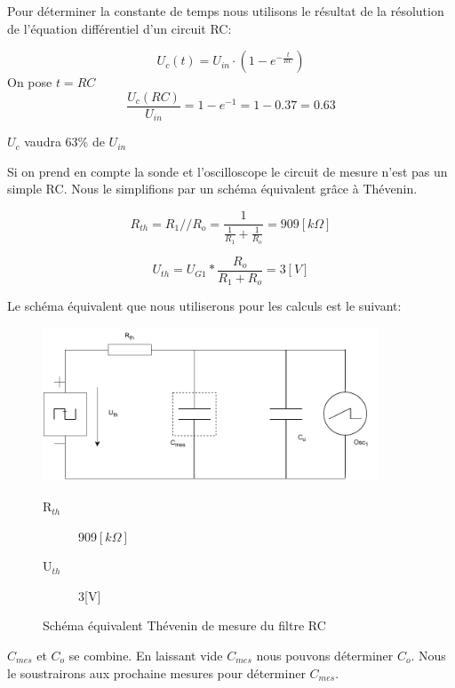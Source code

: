 \newpage

Pour déterminer la constante de temps nous utilisons le résultat de la résolution de l'équation différentiel d'un circuit RC: 

\begin{equation}
 U_{c}(t) = U_{in} \cdot (1 - e^{-\frac{t}{RC}})
\end{equation}
On pose $t = RC$
\begin{equation}
\frac{U_c(RC)}{U_{in}} = 1 - e^{-1} = 1 - 0.37 = 0.63
\end{equation}

 $U_c$ vaudra 63\% de $U_{in}$ 

 
Si on prend en compte la sonde et l'oscilloscope le circuit de mesure n'est pas un simple RC. Nous le simplifions par un schéma équivalent grâce à Thévenin. 
 
\begin{equation}
 R_{th} = R_1 // R_o = \frac{1}{\frac{1}{R_1} + \frac{1}{R_o}} = 909 [k\Omega]
\end{equation}

\begin{equation}
 U_{th} = U_{G1} * \frac{R_o}{R_1 + R_o} = 3 [V]
\end{equation}

Le schéma équivalent que nous utiliserons pour les calculs est le suivant:

\begin{figure}[!ht]
\centering
 \includegraphics[width=10cm]{schemaMesureTH.pdf}
 \begin{description}
 \item[R$_{th}$] 909$[k\Omega]$
 \item[U$_{th}$] 3[V]
\end{description}
 \caption{Schéma équivalent Thévenin de mesure du filtre RC}
\end{figure}

$C_{mes}$ et $C_o$ se combine. En laissant vide $C_{mes}$ nous pouvons déterminer $C_o$. Nous le soustrairons aux prochaine mesures pour déterminer $C_{mes}$.

